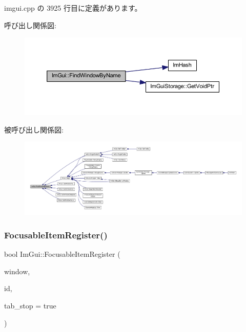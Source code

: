 imgui.\+cpp の 3925 行目に定義があります。

呼び出し関係図\+:\nopagebreak
\begin{figure}[H]
\begin{center}
\leavevmode
\includegraphics[width=350pt]{namespace_im_gui_abca25f22c02e73d5eb2e9c72c4557813_cgraph}
\end{center}
\end{figure}
被呼び出し関係図\+:
\nopagebreak
\begin{figure}[H]
\begin{center}
\leavevmode
\includegraphics[width=350pt]{namespace_im_gui_abca25f22c02e73d5eb2e9c72c4557813_icgraph}
\end{center}
\end{figure}
\mbox{\label{namespace_im_gui_ab1e2f7069edbab669b56e93e30930c45}} 
\subsubsection{\texorpdfstring{Focusable\+Item\+Register()}{FocusableItemRegister()}}
{\footnotesize\ttfamily bool Im\+Gui\+::\+Focusable\+Item\+Register (\begin{DoxyParamCaption}\item[{\mbox{\hyperlink{struct_im_gui_window}{Im\+Gui\+Window}} $\ast$}]{window,  }\item[{\mbox{\hyperlink{imgui_8h_a1785c9b6f4e16406764a85f32582236f}{Im\+Gui\+ID}}}]{id,  }\item[{bool}]{tab\+\_\+stop = {\ttfamily true} }\end{DoxyParamCaption})}



